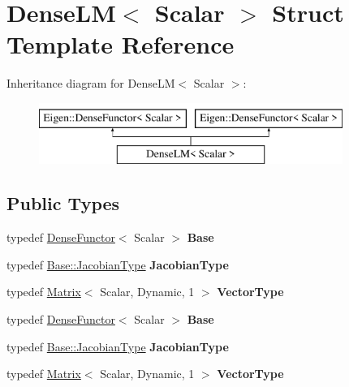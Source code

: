 \hypertarget{struct_dense_l_m}{}\section{Dense\+LM$<$ Scalar $>$ Struct Template Reference}
\label{struct_dense_l_m}
Inheritance diagram for Dense\+LM$<$ Scalar $>$\+:\begin{figure}[H]
\begin{center}
\leavevmode
\includegraphics[height=2.000000cm]{struct_dense_l_m}
\end{center}
\end{figure}
\subsection*{Public Types}
\begin{DoxyCompactItemize}
\item 
\mbox{\label{struct_dense_l_m_aaf1ab9f6b46ebb983239f2c0a68e01ba}} 
typedef \hyperlink{struct_eigen_1_1_dense_functor}{Dense\+Functor}$<$ Scalar $>$ {\bfseries Base}
\item 
\mbox{\label{struct_dense_l_m_a6f4b1203ec13d892f6a55d805db50f87}} 
typedef \hyperlink{group___core___module_class_eigen_1_1_matrix}{Base\+::\+Jacobian\+Type} {\bfseries Jacobian\+Type}
\item 
\mbox{\label{struct_dense_l_m_acc863c7273c3c556c644594c335aa774}} 
typedef \hyperlink{group___core___module_class_eigen_1_1_matrix}{Matrix}$<$ Scalar, Dynamic, 1 $>$ {\bfseries Vector\+Type}
\item 
\mbox{\label{struct_dense_l_m_aaf1ab9f6b46ebb983239f2c0a68e01ba}} 
typedef \hyperlink{struct_eigen_1_1_dense_functor}{Dense\+Functor}$<$ Scalar $>$ {\bfseries Base}
\item 
\mbox{\label{struct_dense_l_m_a6f4b1203ec13d892f6a55d805db50f87}} 
typedef \hyperlink{group___core___module_class_eigen_1_1_matrix}{Base\+::\+Jacobian\+Type} {\bfseries Jacobian\+Type}
\item 
\mbox{\label{struct_dense_l_m_acc863c7273c3c556c644594c335aa774}} 
typedef \hyperlink{group___core___module_class_eigen_1_1_matrix}{Matrix}$<$ Scalar, Dynamic, 1 $>$ {\bfseries Vector\+Type}
\end{DoxyCompactItemize}
